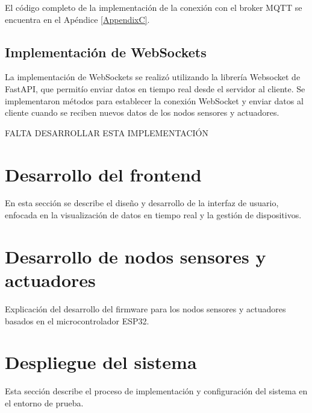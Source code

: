 El código completo de la implementación de la conexión con el broker MQTT se
encuentra en el Apéndice \ref{AppendixC}.

\subsection{Implementación de WebSockets}
La implementación de WebSockets se realizó utilizando la librería Websocket de
FastAPI, que permitío enviar datos en tiempo real desde el servidor al cliente.
Se implementaron métodos para establecer la conexión WebSocket y enviar datos
al cliente cuando se reciben nuevos datos de los nodos sensores y actuadores.

FALTA DESARROLLAR ESTA IMPLEMENTACIÓN

\section{Desarrollo del frontend}

En esta sección se describe el diseño y desarrollo de la interfaz de usuario,
enfocada en la visualización de datos en tiempo real y la gestión de
dispositivos.

\section{Desarrollo de nodos sensores y actuadores}

Explicación del desarrollo del firmware para los nodos sensores y actuadores
basados en el microcontrolador ESP32.

\section{Despliegue del sistema}

Esta sección describe el proceso de implementación y configuración del sistema
en el entorno de prueba.